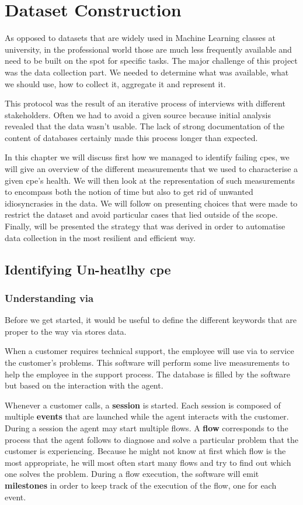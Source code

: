 \chapter{Dataset Construction}
As opposed to datasets that are widely used in Machine Learning classes at university, in the professional world those are much less frequently available and need to be built on the spot for specific tasks. The major challenge of this project was the data collection part. We needed to determine what was available, what we should use, how to collect it, aggregate it and represent it. 

This protocol was the result of an iterative process of interviews with different stakeholders. Often we had to avoid a given source because initial analysis revealed that the data wasn't usable. The lack of strong documentation of the content of databases certainly made this process longer than expected.

In this chapter we will discuss first how we managed to identify failing \acrshort{cpe}s, we will give an overview of the different measurements that we used to characterise a given \acrshort{cpe}'s health. We will then look at the representation of such measurements to encompass both the notion of time but also to get rid of unwanted idiosyncrasies in the data. We will follow on presenting choices that were made to restrict the dataset and avoid particular cases that lied outside of the scope. Finally, will be presented the strategy that was derived in order to automatise data collection in the most resilient and efficient way.

\section{Identifying Un-heatlhy \acrshort{cpe}}
\subsection{Understanding \acrshort{via}}
Before we get started, it would be useful to define the different keywords that are proper to the way \acrshort{via} stores data. 

When a customer requires technical support, the employee will use \acrshort{via} to service the customer's problems. This software will perform some live measurements to help the employee in the support process. The database is filled by the software but based on the interaction with the agent. 

Whenever a customer calls, a \textbf{session} is started. Each session is composed of multiple \textbf{events} that are launched while the agent interacts with the customer. During a session the agent may start multiple flows. A \textbf{flow} corresponds to the process that the agent follows to diagnose and solve a particular problem that the customer is experiencing. Because he might not know at first which flow is the most appropriate, he will most often start many flows and try to find out which one solves the problem. During a flow execution, the software will emit \textbf{milestones} in order to keep track of the execution of the flow, one for each event. 


